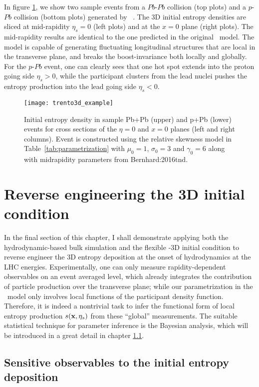 In figure \ref{fig:3d-example}, we show two sample events from a $Pb$-$Pb$ collision (top plots) and a $p$-$Pb$ collision (bottom plots) generated by \trento\ .
The 3D initial entropy densities are sliced at mid-rapidity $\eta_s=0$ (left plots) and at the $x=0$ plane (right plots).
The mid-rapidity results are identical to the one predicted in the original \trento\ model.
The model is capable of generating fluctuating longitudinal structures that are local in the transverse plane, and breaks the boost-invariance both locally and globally.
For the $p$-$Pb$ event, one can clearly sees that one hot spot extends into the proton going side $\eta_s >0$, while the participant clusters from the lead nuclei pushes the entropy production into the lead going side $\eta_s <0$.

\begin{figure}
\centering
\texttt{[image: trento3d\_example]}
\caption{Initial entropy density in sample Pb+Pb (upper) and p+Pb (lower) events for cross sections of the $\eta=0$ and $x=0$ planes (left and right columns). Event is constructed using the relative skewness model in Table~\ref{tab:parametrization} with $\mu_0=1$, $\sigma_0=3$ and $\gamma_0=6$ along with midrapidity parameters from {Bernhard:2016tnd}.}
\label{fig:3d-example}
\end{figure}

\section{Reverse engineering the 3D initial condition}
In the final section of this chapter, I shall demonstrate applying both the hydrodynamic-based bulk simulation and the flexible \trento-3D initial condition to reverse engineer the 3D entropy deposition at the onset of hydrodynamics at the LHC energies.
Experimentally, one can only measure rapidity-dependent observables on an event averaged level, which already integrates the contribution of particle production over the transverse plane; while our parametrization in the \trento\ model only involves local functions of the participant density function.
Therefore, it is indeed a nontrivial task to infer the functional form of local entropy production $s(\mathbf x, \eta_s)$ from these ``global'' measurements.
The suitable statistical technique for parameter inference is the Bayesian 
analysis, which will be introduced in a great detail in chapter \ref{}.

\subsection{Sensitive observables to the initial entropy deposition}
